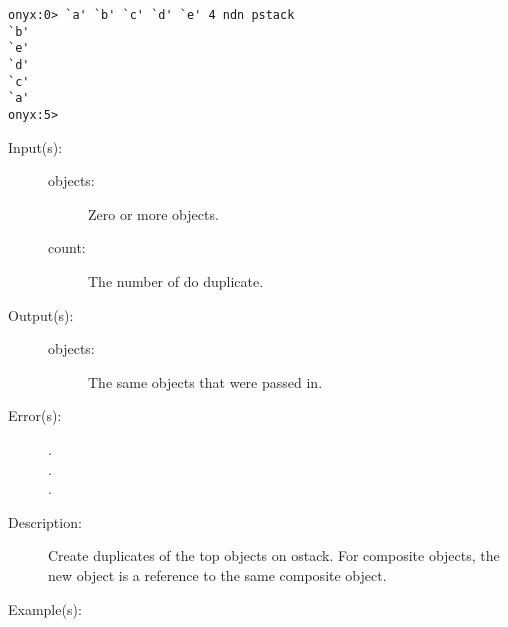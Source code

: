 \begin{description}
\begin{description}
\begin{verbatim}
onyx:0> `a' `b' `c' `d' `e' 4 ndn pstack
`b'
`e'
`d'
`c'
`a'
onyx:5>
		\end{verbatim}
	\end{description}
\label{systemdict:ndup}
\item[{\onyxop{objects count}{ndup}{objects objects}}: ]
	\begin{description}\item[]
	\item[Input(s): ]
		\begin{description}\item[]
		\item[objects: ]
			Zero or more objects.
		\item[count: ]
			The number of  do duplicate.
		\end{description}
	\item[Output(s): ]
		\begin{description}\item[]
		\item[objects: ]
			The same objects that were passed in.
		\end{description}
	\item[Error(s): ]
		\begin{description}\item[]
		\item[.]
		\item[.]
		\item[.]
		\end{description}
	\item[Description: ]
		Create duplicates of the top  objects on ostack.
		For composite objects, the new object is a reference to the same
		composite object.
	\item[Example(s): ]\begin{verbatim}


\end{verbatim}
\end{description}
\end{description}
